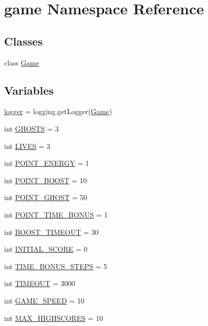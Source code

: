 \hypertarget{namespacegame}{}\section{game Namespace Reference}
\label{namespacegame}
\subsection*{Classes}
\begin{DoxyCompactItemize}
\item 
class \hyperlink{classgame_1_1_game}{Game}
\end{DoxyCompactItemize}
\subsection*{Variables}
\begin{DoxyCompactItemize}
\item 
\hyperlink{namespacegame_a8fc2b1240f7906759533fe5ef2ff79c9}{logger} = logging.\+get\+Logger(\textquotesingle{}\hyperlink{classgame_1_1_game}{Game}\textquotesingle{})
\item 
int \hyperlink{namespacegame_a1cec21c950d87e33631734b5d9bccef1}{G\+H\+O\+S\+TS} = 3
\item 
int \hyperlink{namespacegame_aeb62a47bce8d45a752bb01aa36637b56}{L\+I\+V\+ES} = 3
\item 
int \hyperlink{namespacegame_a01554a8bdb4e39788ebd51abacce8c48}{P\+O\+I\+N\+T\+\_\+\+E\+N\+E\+R\+GY} = 1
\item 
int \hyperlink{namespacegame_ab7c1eb1b290b6682082b20b47295e5fc}{P\+O\+I\+N\+T\+\_\+\+B\+O\+O\+ST} = 10
\item 
int \hyperlink{namespacegame_a8b484737cae4f86704207ffdf5c01b29}{P\+O\+I\+N\+T\+\_\+\+G\+H\+O\+ST} = 50
\item 
int \hyperlink{namespacegame_afbdfe259fb277eb823b18b0f7c3a77f3}{P\+O\+I\+N\+T\+\_\+\+T\+I\+M\+E\+\_\+\+B\+O\+N\+US} = 1
\item 
int \hyperlink{namespacegame_a16da9531d026c659ef9efd581a76d6b8}{B\+O\+O\+S\+T\+\_\+\+T\+I\+M\+E\+O\+UT} = 30
\item 
int \hyperlink{namespacegame_ad39cd0ec0c8ed49dcde69e65fc48b3ab}{I\+N\+I\+T\+I\+A\+L\+\_\+\+S\+C\+O\+RE} = 0
\item 
int \hyperlink{namespacegame_a66c789805fedaecf7a686e074f1ee35d}{T\+I\+M\+E\+\_\+\+B\+O\+N\+U\+S\+\_\+\+S\+T\+E\+PS} = 5
\item 
int \hyperlink{namespacegame_a84614cabd1109114b0c14915bd450ee8}{T\+I\+M\+E\+O\+UT} = 3000
\item 
int \hyperlink{namespacegame_ab560bee319974ba8af92575f98952c27}{G\+A\+M\+E\+\_\+\+S\+P\+E\+ED} = 10
\item 
int \hyperlink{namespacegame_a2c57d4693966108aac84048175308588}{M\+A\+X\+\_\+\+H\+I\+G\+H\+S\+C\+O\+R\+ES} = 10
\end{DoxyCompactItemize}


